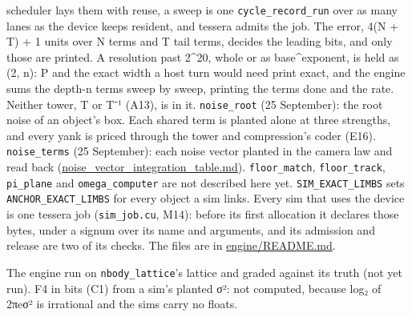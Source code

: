 \begin{description}
scheduler lays them with reuse, a sweep is one \texttt{cycle\_\allowbreak{}record\_\allowbreak{}run} over as many lanes as the device keeps resident, and tessera admits the job. The error, 4(N + T) + 1 units over N terms and T tail terms, decides the leading bits, and only those are printed. A resolution past 2\textasciicircum{}20, whole or as base\textasciicircum{}exponent, is held as (2, n): P and the exact width a host turn would need print exact, and the engine sums the depth-n terms sweep by sweep, printing the terms done and the rate. Neither tower, T or T⁻¹ (A13), is in it. \texttt{noise\_\allowbreak{}root} (25 September): the root noise of an object's box. Each shared term is planted alone at three strengths, and every yank is priced through the tower and compression's coder (E16). \texttt{noise\_\allowbreak{}terms} (25 September): each noise vector planted in the camera law and read back (\hyperref[chap:noise-vector-integration-table]{noise\_\allowbreak{}vector\_\allowbreak{}integration\_\allowbreak{}table.md}). \texttt{floor\_\allowbreak{}match}, \texttt{floor\_\allowbreak{}track}, \texttt{pi\_\allowbreak{}plane} and \texttt{omega\_\allowbreak{}computer} are not described here yet. \texttt{SIM\_\allowbreak{}EXACT\_\allowbreak{}LIMBS} sets \texttt{ANCHOR\_\allowbreak{}EXACT\_\allowbreak{}LIMBS} for every object a sim links. Every sim that uses the device is one tessera job (\texttt{sim\_\allowbreak{}job.\allowbreak{}cu}, M14): before its first allocation it declares those bytes, under a signum over its name and arguments, and its admission and release are two of its checks. The files are in \href{https://github.com/dstroy0/cell_tracking/blob/main/engine/README.md}{engine/README.md}.
\item[{wants}] The engine run on \texttt{nbody\_\allowbreak{}lattice}'s lattice and graded against its truth (not yet run). F4 in bits (C1) from a sim's planted σ²: not computed, because log₂ of 2πeσ² is irrational and the sims carry no floats.

\end{description}
